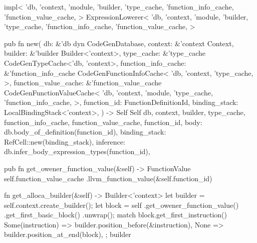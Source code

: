 \documentclass[
  oneside,
  english,
  coorientadorbanca,
  noabntexcite
]{ufsc-thesis-rn46-2019}
\begin{document}
\begin{rustcode}
impl<
        'db,
        'context,
        'module,
        'builder,
        'type_cache,
        'function_info_cache,
        'function_value_cache,
    >
    ExpressionLowerer<
        'db,
        'context,
        'module,
        'builder,
        'type_cache,
        'function_info_cache,
        'function_value_cache,
    >
{
    pub fn new(
        db: &'db dyn CodeGenDatabase,
        context: &'context Context,
        builder: &'builder Builder<'context>,
        type_cache: &'type_cache CodeGenTypeCache<'db, 'context>,
        function_info_cache: &'function_info_cache CodeGenFunctionInfoCache<
            'db,
            'context,
            'type_cache,
        >,
        function_value_cache: &'function_value_cache CodeGenFunctionValueCache<
            'db,
            'context,
            'module,
            'type_cache,
            'function_info_cache,
        >,
        function_id: FunctionDefinitionId,
        binding_stack: LocalBindingStack<'context>,
    ) -> Self {
        Self {
            db,
            context,
            builder,
            type_cache,
            function_info_cache,
            function_value_cache,
            function_id,
            body: db.body_of_definition(function_id),
            binding_stack: RefCell::new(binding_stack),
            inference: db.infer_body_expression_types(function_id),
        }
    }

    pub fn get_owener_function_value(&self) -> FunctionValue {
        self.function_value_cache
            .llvm_function_value(&self.function_id)
    }

    fn get_alloca_builder(&self) -> Builder<'context> {
        let builder = self.context.create_builder();
        let block = self
            .get_owener_function_value()
            .get_first_basic_block()
            .unwrap();
        match block.get_first_instruction() {
            Some(instruction) => builder.position_before(&instruction),
            None => builder.position_at_end(block),
        };
        builder
    }

}
\end{rustcode}
\end{document}
